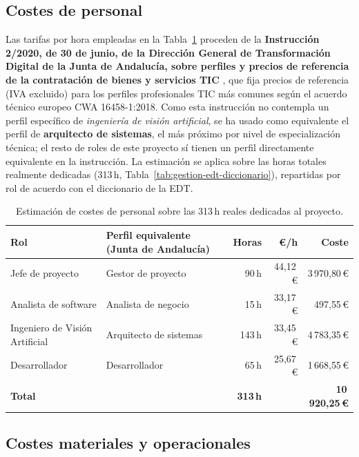\subsection{Costes de personal}

Las tarifas por hora empleadas en la Tabla~\ref{tab:gestion-costes-personal}
proceden de la \textbf{Instrucción 2/2020, de 30 de junio, de la
Dirección General de Transformación Digital de la Junta de Andalucía,
sobre perfiles y precios de referencia de la contratación de bienes y
servicios TIC} \citep{andalucia2020precios}, que fija precios de
referencia (IVA excluido) para los perfiles profesionales TIC más
comunes según el acuerdo técnico europeo CWA 16458-1:2018. Como esta
instrucción no contempla un perfil específico de \emph{ingeniería de
visión artificial},
se ha usado como equivalente el perfil de \textbf{arquitecto de
sistemas}, el más próximo por nivel de especialización técnica; el resto
de roles de este proyecto sí tienen un perfil directamente equivalente
en la instrucción. La estimación se aplica sobre las horas totales
realmente dedicadas (313\,h, Tabla~\ref{tab:gestion-edt-diccionario}),
repartidas por rol de acuerdo con el diccionario de la EDT.

\begin{table}[htp]
\centering
\caption{Estimación de costes de personal sobre las 313\,h reales dedicadas al proyecto.}
\label{tab:gestion-costes-personal}
\renewcommand{\arraystretch}{1.3}
\begin{tabular}{|p{3.6cm}|p{3.4cm}|r|r|r|}
\hline
\rowcolor{gray!25}
\textbf{Rol} & \textbf{Perfil equivalente (Junta de Andalucía)} & \textbf{Horas} & \textbf{€/h} & \textbf{Coste} \\
\hline
Jefe de proyecto & Gestor de proyecto & 90\,h & 44{,}12\,€ & 3\,970{,}80\,€ \\
\hline
Analista de software & Analista de negocio & 15\,h & 33{,}17\,€ & 497{,}55\,€ \\
\hline
Ingeniero de Visión Artificial & Arquitecto de sistemas & 143\,h & 33{,}45\,€ & 4\,783{,}35\,€ \\
\hline
Desarrollador & Desarrollador & 65\,h & 25{,}67\,€ & 1\,668{,}55\,€ \\
\hline
\rowcolor{gray!10}
\textbf{Total} & & \textbf{313\,h} & & \textbf{10\,920{,}25\,€} \\
\hline
\end{tabular}
\end{table}

\subsection{Costes materiales y operacionales}

